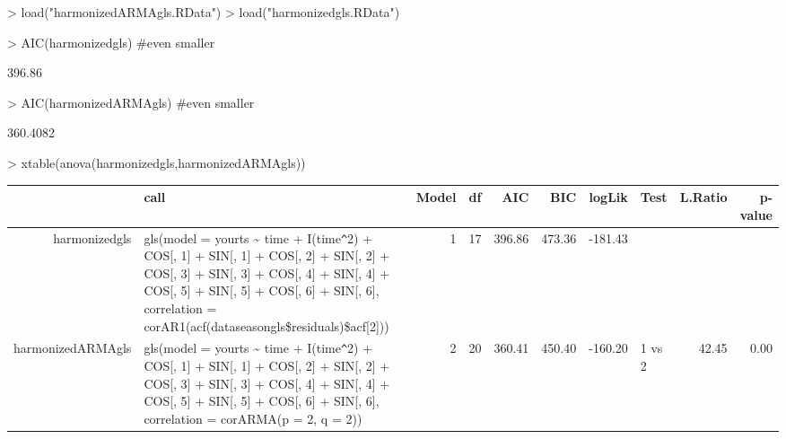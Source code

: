 \documentclass[11pt, a4paper]{article} %
\begin{document}
\begin{Schunk}
\begin{Sinput}
> load("harmonizedARMAgls.RData")
> load("harmonizedgls.RData")
\end{Sinput}
\end{Schunk}

\begin{Schunk}
\begin{Sinput}
> AIC(harmonizedgls) #even smaller 
\end{Sinput}
\begin{Soutput}
[1] 396.86
\end{Soutput}
\begin{Sinput}
> AIC(harmonizedARMAgls) #even smaller 
\end{Sinput}
\begin{Soutput}
[1] 360.4082
\end{Soutput}
\begin{Sinput}
> xtable(anova(harmonizedgls,harmonizedARMAgls))
\end{Sinput}
\begin{Soutput}
\begin{table}[ht]
\centering
\begin{tabular}{rlrrrrrlrr}
  \hline
 & call & Model & df & AIC & BIC & logLik & Test & L.Ratio & p-value \\ 
  \hline
harmonizedgls & gls(model = yourts \~{} time + I(time\verb|^|2) + COS[, 1] + SIN[, 1] +     COS[, 2] + SIN[, 2] + COS[, 3] + SIN[, 3] + COS[, 4] + SIN[,     4] + COS[, 5] + SIN[, 5] + COS[, 6] + SIN[, 6], correlation = corAR1(acf(dataseasongls\$residuals)\$acf[2])) &   1 &  17 & 396.86 & 473.36 & -181.43 &  &  &  \\ 
  harmonizedARMAgls & gls(model = yourts \~{} time + I(time\verb|^|2) + COS[, 1] + SIN[, 1] +     COS[, 2] + SIN[, 2] + COS[, 3] + SIN[, 3] + COS[, 4] + SIN[,     4] + COS[, 5] + SIN[, 5] + COS[, 6] + SIN[, 6], correlation = corARMA(p = 2,     q = 2)) &   2 &  20 & 360.41 & 450.40 & -160.20 & 1 vs 2 & 42.45 & 0.00 \\ 
   \hline
\end{tabular}
\end{table}
\end{Soutput}
\end{Schunk}
\end{document}
